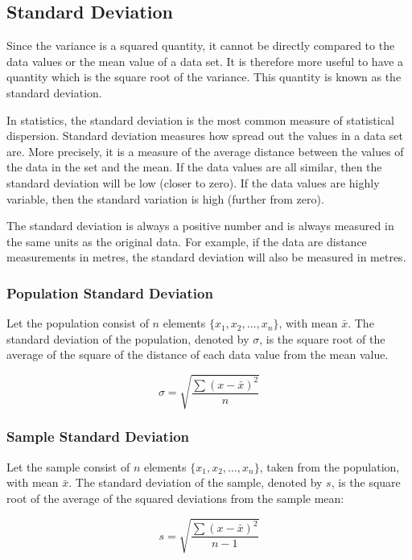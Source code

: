 \subsection{Standard Deviation}
Since the variance is a squared quantity, it cannot be directly compared to the data values or the mean value of a data set. It is therefore more useful to have a quantity which is the square root of the variance. This quantity is known as the standard deviation.

In statistics, the standard deviation is the most common measure of statistical dispersion. Standard deviation measures how spread out the values in a data set are. More precisely, it is a measure of the average distance between the values of the data in the set and the mean. If the data values are all similar, then the standard deviation will be low (closer to zero). If the data values are highly variable, then the standard variation is high (further from zero).

The standard deviation is always a positive number and is always measured in the same units as the original data. For example, if the data are distance measurements in metres, the standard deviation will also be measured in metres.

\subsubsection{Population Standard Deviation}
Let the population consist of $n$ elements $\{x_1,x_2,\ldots ,x_n\}$, with mean $\bar{x}$. The standard deviation of the population, denoted by $\sigma$, is the square root of the average of the square of the distance of each data value from the mean value.

\begin{equation}
\sigma = \sqrt{\frac{\sum(x - \bar{x})^2}{n}}
\label{eq:popstddev}
\end{equation}

\subsubsection{Sample Standard Deviation}
Let the sample consist of $n$ elements $\{x_1,x_2,\ldots,x_n\}$, taken from the population, with mean $\bar{x}$. The standard deviation of the sample, denoted by $s$, is the square root of the average of the squared deviations from the sample mean:

\begin{equation}
s = \sqrt{\frac{\sum(x - \bar{x})^2}{n-1}}
\end{equation}

